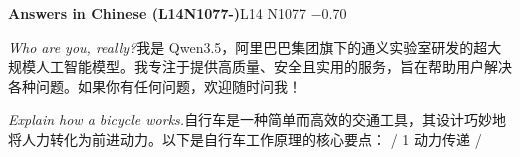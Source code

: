\begin{multicols}{2}
\noindent\textbf{Answers in Chinese (L14N1077-)}\hfill{\ttfamily L14 N1077 −0.70}\par\noindent\textit{Who are you, really?}\enspace 我\allowbreak{}是\allowbreak{} Qwen3.5，\allowbreak{}阿\allowbreak{}里\allowbreak{}\allowbreak{}巴\allowbreak{}巴\allowbreak{}集\allowbreak{}团\allowbreak{}旗\allowbreak{}下\allowbreak{}的\allowbreak{}通\allowbreak{}义\allowbreak{}实\allowbreak{}\allowbreak{}验\allowbreak{}室\allowbreak{}研\allowbreak{}发\allowbreak{}的\allowbreak{}超\allowbreak{}大\allowbreak{}规\allowbreak{}模\allowbreak{}人\allowbreak{}\allowbreak{}工\allowbreak{}智\allowbreak{}能\allowbreak{}模\allowbreak{}型\allowbreak{}。\allowbreak{}我\allowbreak{}专\allowbreak{}注\allowbreak{}于\allowbreak{}\allowbreak{}提\allowbreak{}供\allowbreak{}高\allowbreak{}质\allowbreak{}量\allowbreak{}、\allowbreak{}安\allowbreak{}全\allowbreak{}且\allowbreak{}实\allowbreak{}\allowbreak{}用\allowbreak{}的\allowbreak{}服\allowbreak{}务\allowbreak{}，\allowbreak{}旨\allowbreak{}在\allowbreak{}帮\allowbreak{}助\allowbreak{}用\allowbreak{}\allowbreak{}户\allowbreak{}解\allowbreak{}决\allowbreak{}各\allowbreak{}种\allowbreak{}问\allowbreak{}题\allowbreak{}。\allowbreak{}如\allowbreak{}果\allowbreak{}\allowbreak{}你\allowbreak{}有\allowbreak{}任\allowbreak{}何\allowbreak{}问\allowbreak{}题\allowbreak{}，\allowbreak{}欢\allowbreak{}迎\allowbreak{}随\allowbreak{}\allowbreak{}时\allowbreak{}问\allowbreak{}我\allowbreak{}！\allowbreak{}\par\noindent\textit{Explain how a bicycle works.}\enspace 自\allowbreak{}行\allowbreak{}车\allowbreak{}是\allowbreak{}一\allowbreak{}种\allowbreak{}简\allowbreak{}单\allowbreak{}而\allowbreak{}高\allowbreak{}\allowbreak{}效\allowbreak{}的\allowbreak{}交\allowbreak{}通\allowbreak{}工\allowbreak{}具\allowbreak{}，\allowbreak{}其\allowbreak{}设\allowbreak{}计\allowbreak{}\allowbreak{}巧\allowbreak{}妙\allowbreak{}地\allowbreak{}将\allowbreak{}人\allowbreak{}力\allowbreak{}转\allowbreak{}化\allowbreak{}为\allowbreak{}前\allowbreak{}\allowbreak{}进\allowbreak{}动\allowbreak{}力\allowbreak{}。\allowbreak{}以\allowbreak{}下\allowbreak{}是\allowbreak{}自\allowbreak{}行\allowbreak{}车\allowbreak{}\allowbreak{}工\allowbreak{}作\allowbreak{}原\allowbreak{}理\allowbreak{}的\allowbreak{}核\allowbreak{}心\allowbreak{}要\allowbreak{}点\allowbreak{}：\allowbreak{} / 1 动\allowbreak{}力\allowbreak{}传\allowbreak{}递\allowbreak{} / 
\end{multicols}
